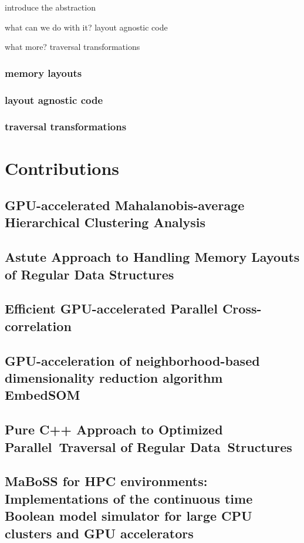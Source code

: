 \documentclass[12pt,a4paper]{report}
\begin{document}
introduce the abstraction

what can we do with it? layout agnostic code

what more? traversal transformations

\section{memory layouts}

\section{layout agnostic code}

\section{traversal transformations}

\part{Contributions}

% 
% 
% 
% 

\chapter{GPU-accelerated Mahalanobis-average Hierarchical Clustering Analysis}
\chapter{Astute Approach to Handling Memory Layouts of Regular Data Structures}
\chapter{Efficient GPU-accelerated Parallel Cross-correlation}
\chapter{GPU-acceleration of neighborhood-based dimensionality reduction algorithm EmbedSOM}


\chapter{Pure C++ Approach to Optimized Parallel~Traversal of Regular Data~Structures}

\chapter{MaBoSS for HPC environments: Implementations of the continuous time Boolean model simulator for large CPU clusters and GPU accelerators}
\end{document}
